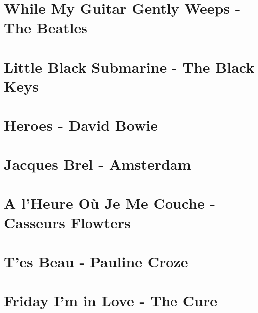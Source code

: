\documentclass{guitartabs}
\begin{document}
\section*{While My Guitar Gently Weeps - The Beatles}
\begin{guitar}

\end{guitar}

\section{Little Black Submarine - The Black Keys}
\begin{guitar}

\end{guitar}


\section*{Heroes - David Bowie}
\begin{guitar}

\end{guitar}


\section{Jacques Brel - Amsterdam}
\begin{guitar}

\end{guitar}

\section{A l'Heure Où Je Me Couche - Casseurs Flowters}
\begin{guitar}

\end{guitar}

\section*{T'es Beau - Pauline Croze}
\begin{guitar}

\end{guitar}


\section{Friday I'm in Love - The Cure}
\begin{guitar}

\end{guitar}
\end{document}
